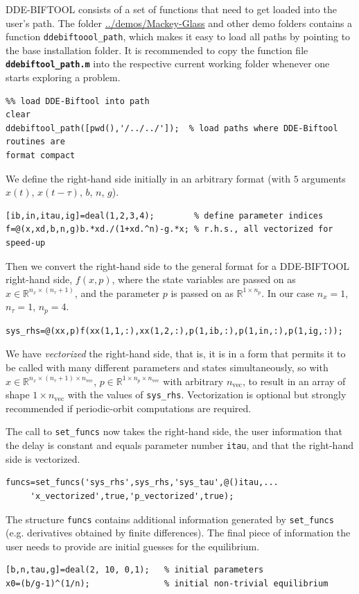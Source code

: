 \documentclass[10pt]{scrartcl}
\newcommand{\DDEBIFCODE}{\textsc{DDE-BIFTOOL}}
\newcommand{\file}[1]{\textbf{\texttt{#1}}}
\newcommand{\RR}{\mathbb{R}}
\newcommand{\blist}[1]{\mbox{\lstinline!#1!}}
\begin{document}
{\DDEBIFCODE} consists of a set of functions that need to get loaded
into the user's path. The folder \url{../demos/Mackey-Glass} and other demo folders contains a function \blist{ddebiftoool_path}, which makes it easy to load all paths by pointing to the base installation folder. It is recommended to copy the function file \file{ddebiftool\_path.m} into the respective current working folder whenever one starts exploring a problem.
\begin{lstlisting}
%% load DDE-Biftool into path
clear
ddebiftool_path([pwd(),'/../../']);  % load paths where DDE-Biftool routines are
format compact
\end{lstlisting}
We define the right-hand side initially in an arbitrary format (with
$5$ arguments $x(t)$, $x(t-\tau)$, $b$, $n$, $g$).
\begin{lstlisting}
[ib,in,itau,ig]=deal(1,2,3,4);        % define parameter indices
f=@(x,xd,b,n,g)b.*xd./(1+xd.^n)-g.*x; % r.h.s., all vectorized for speed-up  
\end{lstlisting}
Then we convert the right-hand side to the general format for a
{\DDEBIFCODE} right-hand side, $f(x,p)$, where the state variables
are passed on as $x\in\RR^{n_x\times (n_\tau+1)}$, and the parameter
$p$ is passed on as $\RR^{1\times n_p}$. In our case $n_x=1$,
$n_\tau=1$, $n_p=4$.
\begin{lstlisting}
sys_rhs=@(xx,p)f(xx(1,1,:),xx(1,2,:),p(1,ib,:),p(1,in,:),p(1,ig,:));
\end{lstlisting}
We have \emph{vectorized} the right-hand side, that is, it is in a
form that permits it to be called with many different parameters and
states simultaneously, so with
$x\in\RR^{n_x\times(n_\tau+1)\times n_\mathrm{vec}}$,
$p\in \RR^{1\times n_p\times n_\mathrm{vec}}$ with arbitrary
$n_\mathrm{vec}$, to result in an array of shape $1\times n_\mathrm{vec}$ with the values of
\blist{sys_rhs}. Vectorization is optional but strongly recommended if
periodic-orbit computations are required.

The call to \blist{set_funcs} now takes the right-hand side, the user information that the delay is constant and equals parameter number \blist{itau}, and that the right-hand side is vectorized.
\begin{lstlisting}
funcs=set_funcs('sys_rhs',sys_rhs,'sys_tau',@()itau,...
     'x_vectorized',true,'p_vectorized',true);
\end{lstlisting}
The structure \blist{funcs} contains additional information 
generated by \blist{set_funcs} (e.g. derivatives obtained by finite differences).
The final piece of information the user needs to provide are initial guesses for the equilibrium.
\begin{lstlisting}
[b,n,tau,g]=deal(2, 10, 0,1);   % initial parameters
x0=(b/g-1)^(1/n);               % initial non-trivial equilibrium  
\end{lstlisting}
\end{document}
